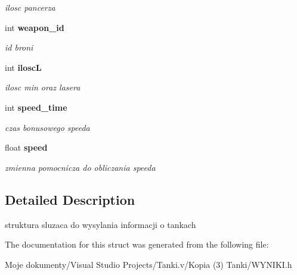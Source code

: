 \begin{CompactItemize}
\begin{CompactList}\small\item\em ilosc pancerza \item\end{CompactList}\item 
int {\bf weapon\_\-id}\label{struct_s_tank_29c8dda8a2cb6600218b17fb7e773b9e}

\begin{CompactList}\small\item\em id broni \item\end{CompactList}\item 
int {\bf iloscL}\label{struct_s_tank_4c05a3f4fed9ed97c4d6383762d978bb}

\begin{CompactList}\small\item\em ilosc min oraz lasera \item\end{CompactList}\item 
int {\bf speed\_\-time}\label{struct_s_tank_ca13b7d007bbc6b519bf0fa89e91ca41}

\begin{CompactList}\small\item\em czas bonusowego speeda \item\end{CompactList}\item 
float {\bf speed}\label{struct_s_tank_85eba6e61a6436db3dad25ba20f37374}

\begin{CompactList}\small\item\em zmienna pomocnicza do obliczania speeda \item\end{CompactList}\end{CompactItemize}


\subsection{Detailed Description}
struktura sluzaca do wysylania informacji o tankach 



The documentation for this struct was generated from the following file:\begin{CompactItemize}
\item 
Moje dokumenty/Visual Studio Projects/Tanki.v/Kopia (3) Tanki/WYNIKI.h\end{CompactItemize}
